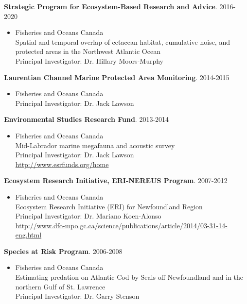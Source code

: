 \documentclass{res}
\begin{document}
\begin{resume}
\textbf{Strategic Program for Ecosystem-Based Research and Advice}. 2016-2020
\begin{itemize} %
	\item[]Fisheries and Oceans Canada\\
Spatial and temporal overlap of cetacean habitat, cumulative noise, and protected areas in the Northwest Atlantic Ocean\\
Principal Investigator: Dr. Hillary Moors-Murphy
\end{itemize}

\textbf{Laurentian Channel Marine Protected Area Monitoring}. 2014-2015
\begin{itemize} %
	\item[]Fisheries and Oceans Canada\\
Principal Investigator: Dr. Jack Lawson
\end{itemize}

\textbf{Environmental Studies Research Fund}. 2013-2014
\begin{itemize} %
	\item[]Fisheries and Oceans Canada\\
Mid-Labrador marine megafauna and acoustic survey\\
Principal Investigator: Dr. Jack Lawson\\
\url{http://www.esrfunds.org/home}
\end{itemize}

\textbf{Ecosystem Research Initiative, ERI-NEREUS Program}. 2007-2012
\begin{itemize} %
	\item[]Fisheries and Oceans Canada\\
Ecosystem Research Initiative (ERI) for Newfoundland Region\\
Principal Investigator: Dr. Mariano Koen-Alonso\\
\url{http://www.dfo-mpo.gc.ca/science/publications/article/2014/03-31-14-eng.html}
\end{itemize}

\textbf{Species at Risk Program}. 2006-2008
\begin{itemize} %
	\item[] Fisheries and Oceans Canada\\
Estimating predation on Atlantic Cod by Seals off Newfoundland and in the northern Gulf of St. Lawrence \\
Principal Investigator: Dr. Garry Stenson
\end{itemize}


\end{resume}
\end{document}
